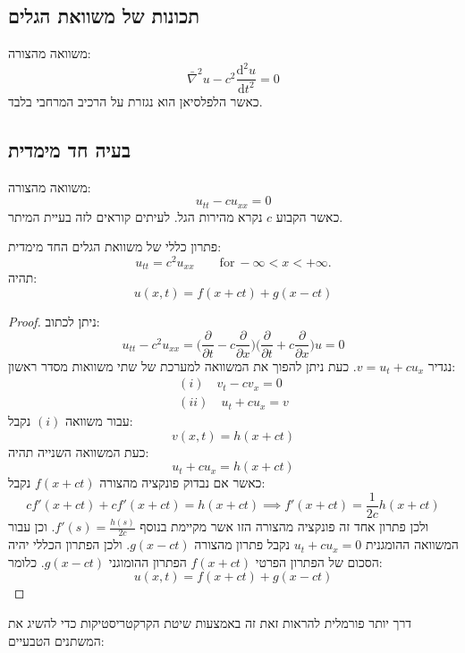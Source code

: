 \documentclass{tstextbook}
\begin{document}
\subsection{תכונות של משוואת הגלים}

\begin{definition}
משוואה מהצורה:
$$\bar{\nabla}^2 u-c^{2}\frac{\mathrm{d} ^{2}u}{\mathrm{d} t^{2}} =0$$
כאשר הלפלסיאן הוא נגזרת על הרכיב המרחבי בלבד.

\end{definition}
\begin{proposition}[קוסליות]
\end{proposition}
\subsection{בעיה חד מימדית}

\begin{definition}
משוואה מהצורה:
$$u_{tt}-cu_{x x}=0$$
כאשר הקבוע \(c\) נקרא מהירות הגל. לעיתים קוראים לזה בעיית המיתר.

\end{definition}
\begin{proposition}
פתרון כללי של משוואת הגלים החד מימדית:
$$u_{t t}=c^{2}u_{x x}\qquad\mathrm{for}\ -\infty<x<+\infty.$$
תהיה:
$$u(x,t)=f(x+c t)+g(x-c t)$$

\end{proposition}
\begin{proof}
ניתן לכתוב:
$$u_{t t}-c^{2}u_{x x}=\bigg({\frac{\partial}{\partial t}}-c{\frac{\partial}{\partial x}}\bigg)\bigg({\frac{\partial}{\partial t}}+c{\frac{\partial}{\partial x}}\bigg)u=0$$
נגדיר \(v=u_{t}+cu_{x}\). כעת ניתן להפוך את המשוואה למערכת של שתי משוואות מסדר ראשון:
$$\begin{gather}(i)\quad v_{t}-c v_{x}=0 \\(ii)\quad u_{t}+cu_{x}=v \end{gather}
$$
עבור משוואה \((i)\) נקבל:
$$v(x,t)=h(x+c t)$$
כעת המשוואה השנייה תהיה:
$$u_{t}+c u_{x}=h(x+c t)$$
כאשר אם נבדוק פונקציה מהצורה \(f(x+ct)\) נקבל:
$$cf'(x+ct)+cf'(x+ct)=h(x+ct)\implies f'(x+ct)= \frac{1}{2c} h(x+ct)$$
ולכן פתרון אחד זה פונקציה מהצורה הזו אשר מקיימת בנוסף \(f'(s)=\frac{h(s)}{2c}\). וכן עבור המשוואה ההומגנית \(u_{t}+cu_{x}=0\) נקבל פתרון מהצורה \(g(x-ct)\).  ולכן הפתרון הכללי יהיה הסכום של הפתרון הפרטי \(f(x+ct)\) הפתרון ההומוגני \(g(x-ct)\). כלומר:
$$u(x,t)=f(x+ct)+g(x-ct)$$

\end{proof}
דרך יותר פורמלית להראות זאת זה באמצעות שיטת הקרקטריסטיקות כדי להשיג את המשתנים הטבעיים:
\end{document}
